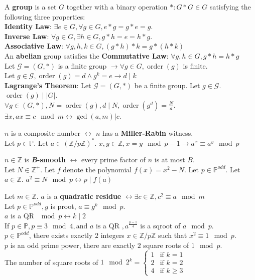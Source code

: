 \documentclass[10pt]{article}
\DeclareMathOperator{\ord}{order}
\begin{document}
\begin{multicols}{2}
    \noindent
    A \textbf{group} is a set $G$ together with a binary operation $*:G*G\in G$ satisfying the following three properties:\\
    \textbf{Identity Law}: $\exists e\in G,\forall g\in G, e*g=g*e=g$.\\
    \textbf{Inverse Law}: $\forall g\in G,\exists h\in G, g*h=e=h*g$.\\
    \textbf{Associative Law}: $\forall g,h,k\in G,(g*h)*k=g*(h*k)$\\
    An \textbf{abelian} group satisfies the \textbf{Commutative Law}: $\forall g,h\in G,g*h=h*g$\\
    Let $\mathcal{G}=(G,*)$ is a finite group $\rightarrow \forall g\in G,\ord(g)$ is finite.\\
    Let $g\in\mathcal{G},\ord{(g)}=d\land g^k=e\rightarrow d\mid k$\\
    \textbf{Lagrange's Theorem}: Let $\mathcal{G}=(G,*)$ be a finite group. Let $g\in\mathcal{G}$. $\ord{(g)}\mid |G|$.\\
    $\forall g\in (G,*), N = \ord(g), d \mid N, \ord(g^d) = \frac{N}{d}$.\\
    $\exists x, ax\equiv c\mod m \leftrightarrow \gcd(a,m)|c$.

    \noindent
    $n$ is a composite number $\leftrightarrow$ $n$ has a \textbf{Miller-Rabin} witness.\\
    Let $p\in\mathbb{P}$. Let $a\in(\mathbb{Z}/p\mathbb{Z})^*$. $x,y\in\mathbb{Z},x=y\mod{p-1}\rightarrow a^x\equiv a^y\mod{p}$

    \noindent
    $n\in\mathbb{Z}$ is \textbf{\textit{B}-smooth} $\leftrightarrow$ every prime factor of $n$ is at most $B$.\\
    Let $N\in\mathbb{Z}^+$. Let $f$ denote the polynomial $f(x)=x^2-N$. Let $p\in\mathbb{P}^{odd}$. Let $a\in\mathbb{Z}$. $a^2\equiv N\mod{p}\leftrightarrow p\mid f(a)$

    \noindent
    Let $m\in\mathbb{Z}$. $a$ is a \textbf{quadratic residue} $\leftrightarrow \exists c\in\mathbb{Z},c^2\equiv a\mod{m}$\\
    Let $p\in\mathbb{P}^{odd},g$ is proot, $a\equiv g^k\mod{p}$. \\$a$ is a QR $\mod{p}\leftrightarrow k\mid 2$\\
        If $p\in \mathbb{P}, p\equiv 3\mod 4,\text{and $a$ is a QR }, a^{\frac{p-1}{4}}$ is a sqroot of $a \mod p$.\\
    $p\in \mathbb{P}^{\textit{odd}}$, there exists exactly $2$ integers $x \in \mathbb{Z}/p\mathbb{Z}$ such that $x^2 \equiv 1 \mod p$. \\
    $p$ is an odd prime power, there are exactly $2$ square roots of $1 \mod p$.\\
        The number of square roots of $1\mod{2^k}=\begin{cases}
        1 & \text{if } k=1     \\
        2 & \text{if } k=2     \\
        4 & \text{if } k\geq 3
    \end{cases}$


\end{multicols}
\end{document}
